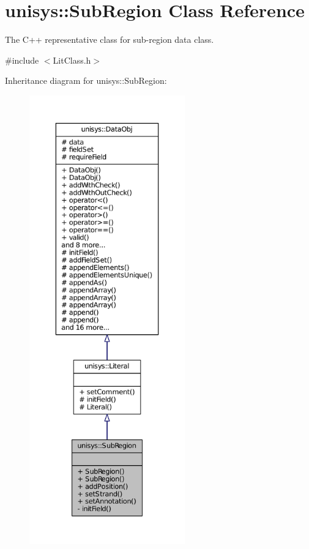 \hypertarget{classunisys_1_1SubRegion}{\section{unisys\-:\-:Sub\-Region Class Reference}
\label{classunisys_1_1SubRegion}
}


The C++ representative class for sub-\/region data class.  




{\ttfamily \#include $<$Lit\-Class.\-h$>$}



Inheritance diagram for unisys\-:\-:Sub\-Region\-:
\nopagebreak
\begin{figure}[H]
\begin{center}
\leavevmode
\includegraphics[height=550pt]{classunisys_1_1SubRegion__inherit__graph}
\end{center}
\end{figure}


